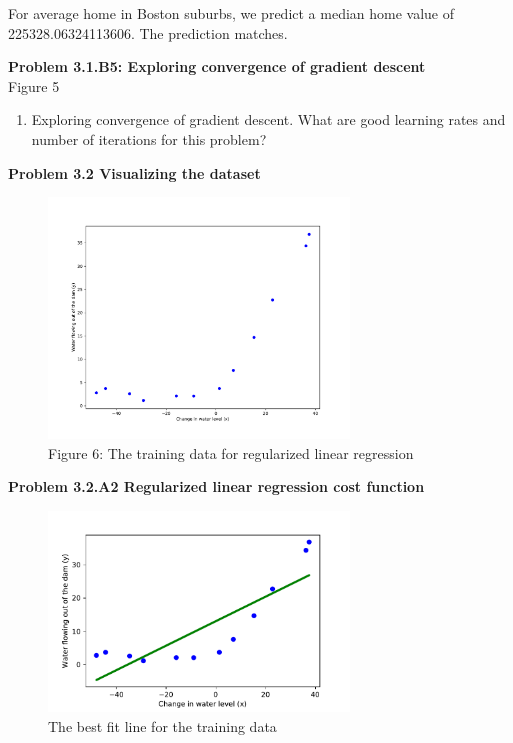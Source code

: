 \documentclass[]{book}
\theoremstyle{definition}
\begin{document}
\begin{flushleft}
	For average home in Boston suburbs, we predict a median home value of 225328.06324113606. The prediction matches.
\end{flushleft}
\textbf{Problem 3.1.B5: Exploring convergence of gradient descent}\\
Figure 5
\begin{enumerate}
	\item Exploring convergence of gradient descent. What are good learning rates and number of iterations for this problem?	
\end{enumerate}
\textbf{Problem 3.2 Visualizing the dataset}
\begin{figure}[H]
	\centering
	\includegraphics[width=8cm]{fig6.pdf}
	\caption{Figure 6: The training data for regularized linear regression}
	\label{fig:6}
\end{figure}

\textbf{Problem 3.2.A2 Regularized linear regression cost function}
\begin{figure}[H]
	\centering
	\includegraphics[width=8cm]{fig7.pdf}
	\caption{The best fit line for the training data}
	\label{fig:7}
\end{figure}
\end{document}
